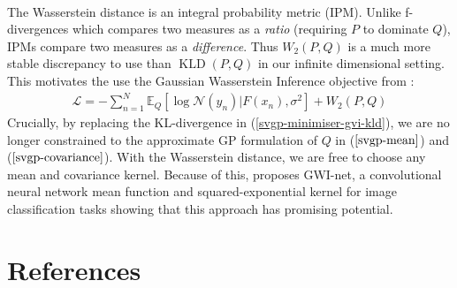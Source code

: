 \documentclass[twoside,11pt]{article}
\newcommand{\KLD}{\operatorname{KLD}}
\begin{document}
\\The Wasserstein distance is an integral probability metric (IPM). Unlike f-divergences which compares two measures as a \textit{ratio} (requiring $P$ to dominate $Q$), IPMs compare two measures as a \textit{difference}. Thus $W_2(P, Q)$ is a much more stable discrepancy to use than $\KLD(P, Q)$ in our infinite dimensional setting. This motivates the use the Gaussian Wasserstein Inference objective from \cite{wild2022generalized}:
\begin{align}
    \label{gwi-objective}
    \mathcal{L} = -\sum_{n=1}^N \mathbb{E}_{Q}\left[\log \mathcal{N}(y_n) \vert F(x_n), \sigma^2\right] + W_2 (P, Q)
\end{align}
Crucially, by replacing the KL-divergence in (\ref{svgp-minimiser-gvi-kld}), we are no longer constrained to the approximate GP formulation of $Q$ in  ($\ref{svgp-mean}$) and ($\ref{svgp-covariance}$). With the Wasserstein distance, we are free to choose any mean and covariance kernel. Because of this, \cite{wild2022generalized} proposes GWI-net, a convolutional neural network mean function and squared-exponential kernel for image classification tasks showing that this approach has promising potential.
\begingroup
\let\clearpage\relax
\AtNextBibliography{\small}
\section*{References}
\printbibliography[heading=talikarng, title = {References}]
\endgroup
\end{document}
